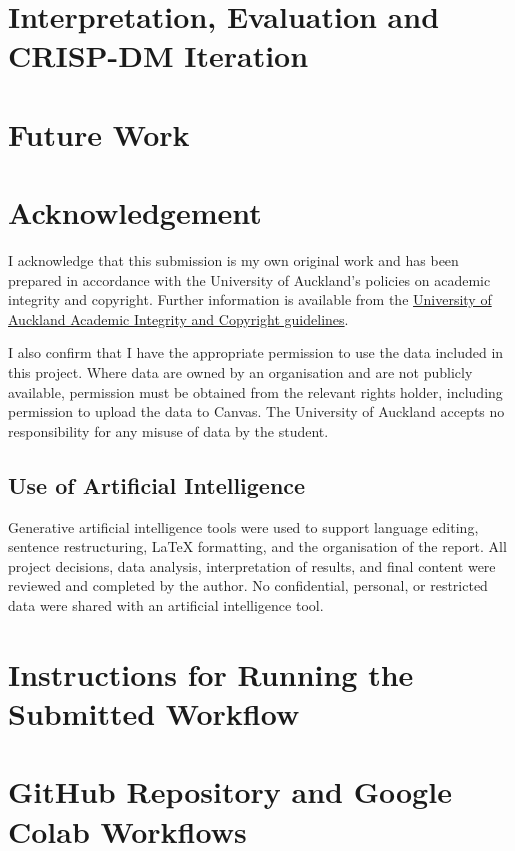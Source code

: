 \documentclass[a4paper]{article}
\begin{document}
\section{Interpretation, Evaluation and CRISP-DM Iteration}
\label{sec:multiple-iteration}


\section{Future Work}
\label{sec:future-work}


\newpage
\section{Acknowledgement}
I acknowledge that this submission is my own original work and has been prepared in accordance with the University of Auckland's policies on academic integrity and copyright. Further information is available from the
\href{https://www.auckland.ac.nz/en/students/forms-policies-and-guidelines/student-policies-and-guidelines/academic-integrity-copyright.html}
{University of Auckland Academic Integrity and Copyright guidelines}.

I also confirm that I have the appropriate permission to use the data included in this project. Where data are owned by an organisation and are not publicly available, permission must be obtained from the relevant rights holder, including permission to upload the data to Canvas. The University of Auckland accepts no responsibility for any misuse of data by the student.

\subsection*{Use of Artificial Intelligence}
Generative artificial intelligence tools were used to support language editing, sentence restructuring, LaTeX formatting, and the organisation of the report. All project decisions, data analysis, interpretation of results, and final content were reviewed and completed by the author. No confidential, personal, or restricted data were shared with an artificial intelligence tool.

\newpage

\printbibliography[
    heading=bibintoc,
    title={References}
]

\clearpage
\appendix
\section{Instructions for Running the Submitted Workflow}
\label{app:running-workflow}


\clearpage
\section{GitHub Repository and Google Colab Workflows}
\label{app:github-colab}

\end{document}
